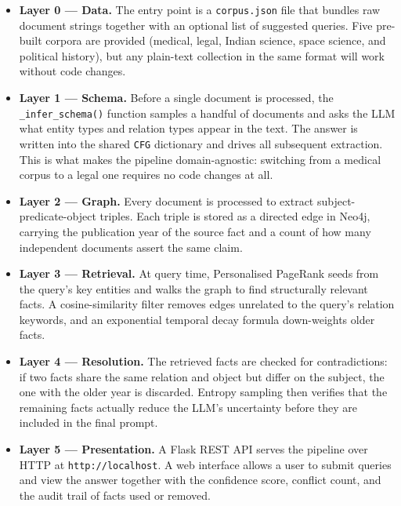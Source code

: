\begin{itemize}
    \item \textbf{Layer 0 --- Data.} The entry point is a \texttt{corpus.json} file
    that bundles raw document strings together with an optional list of suggested
    queries. Five pre-built corpora are provided (medical, legal, Indian science,
    space science, and political history), but any plain-text collection in the
    same format will work without code changes.

    \item \textbf{Layer 1 --- Schema.} Before a single document is processed, the
    \texttt{\_infer\_schema()} function samples a handful of documents and asks the
    LLM what entity types and relation types appear in the text. The answer
    is written into the shared \texttt{CFG} dictionary and drives all subsequent
    extraction. This is what makes the pipeline domain-agnostic: switching from a
    medical corpus to a legal one requires no code changes at all.

    \item \textbf{Layer 2 --- Graph.} Every document is processed to extract
    subject-predicate-object triples. Each triple is stored as a directed edge in
    Neo4j, carrying the publication year of the source fact and a count of how many
    independent documents assert the same claim.

    \item \textbf{Layer 3 --- Retrieval.} At query time, Personalised PageRank seeds
    from the query's key entities and walks the graph to find structurally relevant
    facts. A cosine-similarity filter removes edges unrelated to the query's relation
    keywords, and an exponential temporal decay formula down-weights older facts.

    \item \textbf{Layer 4 --- Resolution.} The retrieved facts are checked for
    contradictions: if two facts share the same relation and object but differ on
    the subject, the one with the older year is discarded. Entropy sampling then
    verifies that the remaining facts actually reduce the LLM's uncertainty before
    they are included in the final prompt.

    \item \textbf{Layer 5 --- Presentation.} A Flask REST API serves the pipeline
    over HTTP at \texttt{http://localhost}. A web interface allows a user to
    submit queries and view the answer together with the confidence score,
    conflict count, and the audit trail of facts used or removed.
\end{itemize}

